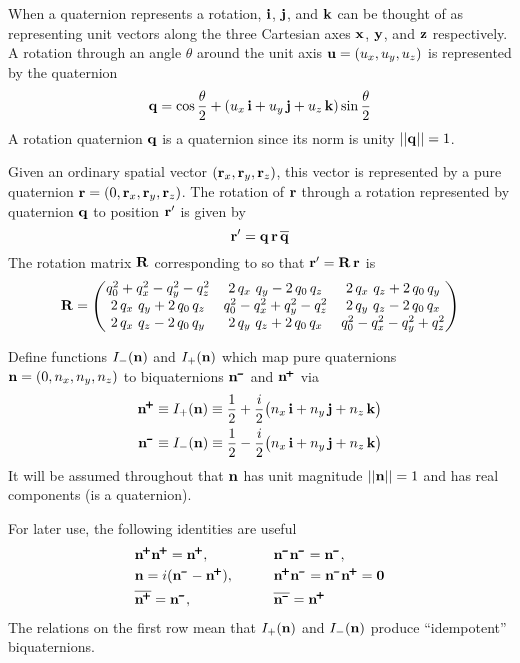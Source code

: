 When a quaternion represents a rotation, ${\bf i}$, ${\bf j}$, and ${\bf k}$ can be thought of as representing unit
vectors along the three Cartesian axes ${\bf x}$, ${\bf y}$, and ${\bf z}$ respectively. A rotation through an angle
$\theta$ around the unit axis ${\bf u} = (u_x, u_y, u_z)$ is represented by the quaternion
\begin{equation}
  {\bf q} = \cos\frac{\theta}{2} + (u_x \, {\bf i} + u_y \, {\bf j} + u_z \, {\bf k}) \sin\frac{\theta}{2}
  \label{qt2ui}
\end{equation}
A rotation quaternion ${\bf q}$ is a  quaternion since its norm is unity $||{\bf q}|| = 1$.

Given an ordinary spatial vector $({\bf r}_x, {\bf r}_y, {\bf r}_z)$, this vector is represented by a
pure quaternion ${\bf r} = (0, {\bf r}_x, {\bf r}_y, {\bf r}_z)$. The rotation of ${\bf r}$ through a rotation
represented by quaternion ${\bf q}$ to position ${\bf r}'$ is given by
\begin{equation}
  \bfr' = \bfq \, \bfr \, \BAR\bfq
  \label{rqrq}
\end{equation}
The rotation matrix ${\bf R}$ corresponding to  so that ${\bf r}' = {\bf R} \, {\bf r}$ is
\begin{equation}
  {\bf R} = \begin{pmatrix}
    q_0^2 + q_x^2 - q_y^2 - q_z^2    & 2 \, q_x \ q_y - 2 \, q_0 \, q_z & 2 \, q_x \ q_z + 2 \, q_0 \, q_y \\
    2 \, q_x \ q_y + 2 \, q_0 \, q_z & q_0^2 - q_x^2 + q_y^2 - q_z^2    & 2 \, q_y \ q_z - 2 \, q_0 \, q_x \\
    2 \, q_x \ q_z - 2 \, q_0 \, q_y & 2 \, q_y \ q_z + 2 \, q_0 \, q_x & q_0^2 - q_x^2 - q_y^2 + q_z^2 
  \end{pmatrix}
  \label{rqqq}
\end{equation}

Define functions $I_-({\bf n})$ and $I_+({\bf n})$ which map pure quaternions ${\bf n} = (0, n_x, n_y, n_z)$ to biquaternions
$\bfn^\mmin$ and $\bfn^\ppls$ via
\begin{align}
  \bfn^\ppls &\equiv I_+(\bfn) \equiv \frac{1}{2} + \frac{i}{2}  \big( n_x \, \cali + n_y \, \calj + n_z \, \calk \big) \CRNO
  \bfn^\mmin &\equiv I_-(\bfn) \equiv \frac{1}{2} - \frac{i}{2} \big( n_x \, \cali + n_y \, \calj + n_z \, \calk \big)
  \label{n1in}
\end{align}
It will be assumed throughout that ${\bf n}$ has unit magnitude $||{\bf n}|| = 1$ and has real components (is a quaternion).

For later use, the following identities are useful
\begin{alignat}{2}
   &\bfn^\ppls \bfn^\ppls = \bfn^\ppls, \qquad
  &&\bfn^\mmin \bfn^\mmin = \bfn^\mmin, \label{n6} \\
   &\bfn = i (\bfn^\mmin - \bfn^\ppls), \qquad
  &&\bfn^\ppls \bfn^\mmin = \bfn^\mmin \bfn^\ppls = \Bf 0 \CRNO
   &\BAR{\bfn^\ppls} = \bfn^\mmin, \qquad
  &&\BAR{\bfn^\mmin} = \bfn^\ppls
  \nonumber
\end{alignat}
The relations on the first row mean that $I_+({\bf n})$ and $I_-({\bf n})$ produce ``idempotent''
biquaternions\cite{b:biquat}.

